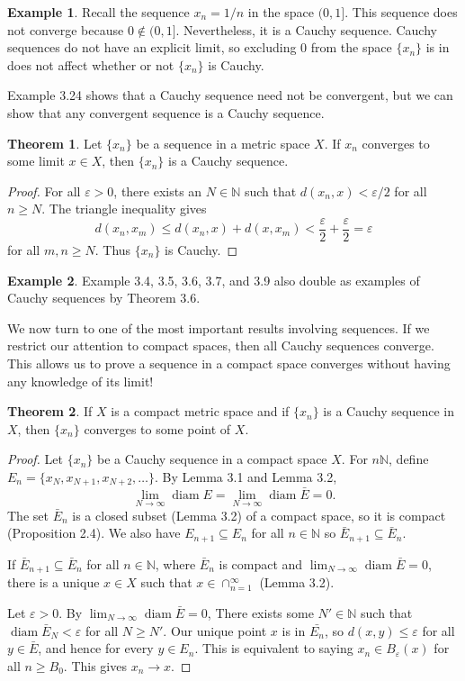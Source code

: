 \documentclass{article}
\newcommand{\N}{\mathbb{N}}
\DeclareMathOperator{\diam}{diam}
\theoremstyle{definition}
\newtheorem{theorem}{Theorem}[section]
\newtheorem{example}{Example}[section]
\begin{document}
	\begin{example}
		Recall the sequence $ x_n=1/n $ in the space $ (0,1] $. This sequence does not converge because $ 0\notin(0,1] $. Nevertheless, it is a Cauchy sequence. Cauchy sequences do not have an explicit limit, so excluding $ 0 $ from the space $ \{x_n\} $ is in does not affect whether or not $ \{x_n\} $ is Cauchy.
	\end{example}
	Example 3.24 shows that a Cauchy sequence need not be convergent, but we can show that any convergent sequence is a Cauchy sequence.
	\begin{theorem}
		Let $ \{x_n\} $ be a sequence in a metric space $ X $. If $ x_n $ converges to some limit $ x\in X $, then $ \{x_n\} $ is a Cauchy sequence. 
	\end{theorem} 
	\begin{proof}
		For all $ \varepsilon>0 $, there exists an $ N\in\N $ such that $ d(x_n,x)<\varepsilon/2 $ for all $ n\ge N $. The triangle inequality gives $$d(x_n,x_m)\le d(x_n,x)+d(x,x_m)<\frac{\varepsilon}{2}+\frac{\varepsilon}{2}=\varepsilon $$ for all $ m,n\ge N $. Thus $ \{x_n\} $ is Cauchy. 
	\end{proof}
	\begin{example}
		Example 3.4, 3.5, 3.6, 3.7, and 3.9 also double as examples of Cauchy sequences by Theorem 3.6.
	\end{example}
	We now turn to one of the most important results involving sequences. If we restrict our attention to compact spaces, then all Cauchy sequences converge. This allows us to prove a sequence in a compact space converges without having any knowledge of its limit! 
	\begin{theorem}
		If $ X $ is a compact metric space and if $ \{x_n\} $ is a Cauchy sequence in $ X $, then $ \{x_n\} $ converges to some point of $ X $.
	\end{theorem}
	\begin{proof}
		Let $ \{x_n\} $ be a Cauchy sequence in a compact space $ X $. For $ n\N $, define $ E_n=\{x_N,x_{N+1},x_{N+2},\ldots\} $. By Lemma 3.1 and Lemma 3.2, $$ \lim_{N\to\infty} \diam E=\lim_{N\to\infty} \diam\bar{E}=0. $$ The set $ \bar{E}_n $ is a closed subset (Lemma 3.2) of a compact space, so it is compact (Proposition 2.4). We also have $ E_{n+1}\subseteq E_n $ for all $ n\in\N $ so $ \bar{E}_{n+1}\subseteq \bar{E}_n $.
		
		If  $ \bar{E}_{n+1}\subseteq \bar{E}_n $ for all $ n\in\N $, where $ \bar{E}_n $ is compact and 	$ \lim_{N\to\infty} \diam\bar{E}=0 $, there is a unique $ x\in X $ such that $ x\in\cap_{n=1}^\infty $  (Lemma 3.2). 
		
		Let $ \varepsilon>0 $. By $ \lim_{N\to\infty} \diam\bar{E}=0 $, There exists some $ N'\in\N $ such that $ \diam\bar{E}_N<\varepsilon $ for all $ N\ge N' $. Our unique point $ x $ is in $ \bar{E_n} $, so $ d(x,y)\le\varepsilon $ for all $ y\in\bar{E} $, and hence for every $ y\in E_n $. This is equivalent to saying $ x_n\in B_\varepsilon(x) $ for all $ n\ge B_0 $. This gives $ x_n\to x $. 
	\end{proof}
\end{document}
